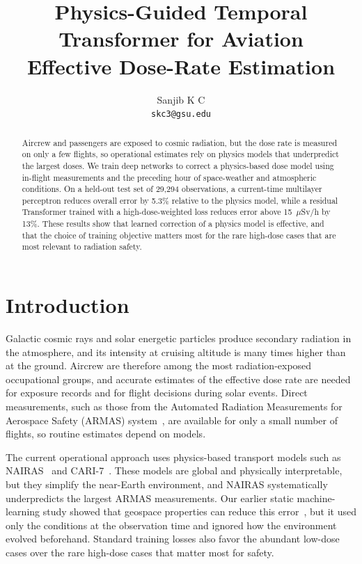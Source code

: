 \documentclass[10pt,twocolumn,letterpaper]{article}
\begin{document}
\title{Physics-Guided Temporal Transformer for Aviation\\Effective Dose-Rate Estimation}

\author{Sanjib K C\\
{\tt\small skc3@gsu.edu}
}

\maketitle
\thispagestyle{empty}

\begin{abstract}
Aircrew and passengers are exposed to cosmic radiation, but the dose rate is
measured on only a few flights, so operational estimates rely on physics
models that underpredict the largest doses. We train deep networks to correct
a physics-based dose model using in-flight measurements and the preceding hour
of space-weather and atmospheric conditions. On a held-out test set of 29,294
observations, a current-time multilayer perceptron reduces overall error by
5.3\% relative to the physics model, while a residual Transformer trained with
a high-dose-weighted loss reduces error above 15~$\mu$Sv/h by 13\%. These
results show that learned correction of a physics model is effective, and
that the choice of training objective matters most for the rare high-dose
cases that are most relevant to radiation safety.
\end{abstract}

\section{Introduction}
\label{sec:intro}

Galactic cosmic rays and solar energetic particles produce secondary radiation
in the atmosphere, and its intensity at cruising altitude is many times higher
than at the ground. Aircrew are therefore among the most radiation-exposed
occupational groups, and accurate estimates of the effective dose rate are
needed for exposure records and for flight decisions during solar events.
Direct measurements, such as those from the Automated Radiation Measurements
for Aerospace Safety (ARMAS) system~\cite{tobiska2016}, are available for only
a small number of flights, so routine estimates depend on models.

The current operational approach uses physics-based transport models such as
NAIRAS~\cite{mertens2013} and CARI-7~\cite{copeland2017}. These models are
global and physically interpretable, but they simplify the near-Earth
environment, and NAIRAS systematically underpredicts the largest ARMAS
measurements. Our earlier static machine-learning study showed that geospace
properties can reduce this error~\cite{kc2025}, but it used only the conditions
at the observation time and ignored how the environment evolved beforehand.
Standard training losses also favor the abundant low-dose cases over the rare
high-dose cases that matter most for safety.
\end{document}
